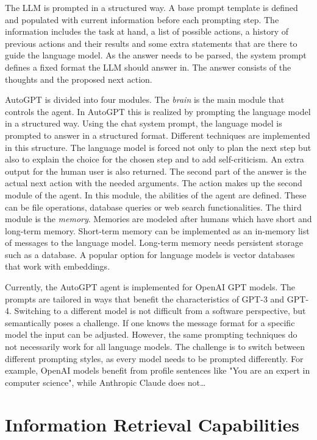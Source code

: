 \documentclass[../main.tex]{subfiles}
\begin{document}
The LLM is prompted in a structured way.
A base prompt template is defined
and populated with current information before each prompting step.
The information includes the task at hand,
a list of possible actions,
a history of previous actions and their results
and some extra statements that are there to guide the language model.
As the answer needs to be parsed,
the system prompt defines a fixed format the LLM should answer in.
The answer consists of the thoughts and the proposed next action.

AutoGPT is divided into four modules.
The \textit{brain} is the main module that controls the agent.
In AutoGPT this is realized by prompting the language model in a structured way.
Using the chat system prompt,
the language model is prompted to answer in a structured format.
Different techniques are implemented in this structure.
The language model is forced not only to plan the next step
but also to explain the choice for the chosen step and to add self-criticism.
An extra output for the human user is also returned.
The second part of the answer is the actual next action with the needed arguments.
The action makes up the second module of the agent.
In this module, the abilities of the agent are defined.
These can be file operations,
database queries or web search functionalities.
The third module is the \textit{memory}.
Memories are modeled after humans which have short and long-term memory.
Short-term memory can be implemented
as an in-memory list of messages to the language model.
Long-term memory needs persistent storage such as a database.
A popular option for language models is vector databases that work with embeddings.

Currently,
the AutoGPT agent is implemented for OpenAI GPT models.
The prompts are tailored in ways
that benefit the characteristics of GPT-3 and GPT-4.
Switching to a different model is not difficult from a software perspective,
but semantically poses a challenge.
If one knows the message format for a specific model the input can be adjusted.
However, the same prompting techniques do not necessarily work for all language models.
The challenge is to switch between different prompting styles,
as every model needs to be prompted differently.
For example,
OpenAI models benefit from profile sentences like "You are an expert in computer science",
while Anthropic Claude does not\dots

\section{Information Retrieval Capabilities}
\end{document}
